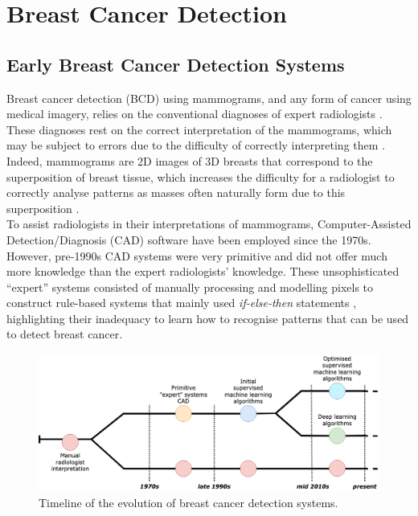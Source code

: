 
\section{Breast Cancer Detection}

\subsection{Early Breast Cancer Detection Systems}


Breast cancer detection (BCD) using mammograms, and any form of cancer using medical imagery, relies on the conventional diagnoses of expert radiologists \cite{Osareh2010}. These diagnoses rest on the correct interpretation of the mammograms, which may be subject to errors due to the difficulty of correctly interpreting them \cite{Elter2009}. Indeed, mammograms are 2D images of 3D breasts that correspond to the superposition of breast tissue, which increases the difficulty for a radiologist to correctly analyse patterns as masses often naturally form due to this superposition \cite{Elter2009}.\\

To assist radiologists in their interpretations of mammograms, Computer-Assisted Detection/Diagnosis (CAD) software have been employed since the 1970s. However, pre-1990s CAD systems were very primitive and did not offer much more knowledge than the expert radiologists' knowledge. These unsophisticated ``expert'' systems consisted of manually processing and modelling pixels to construct rule-based systems that mainly used \textit{if-else-then} statements \cite{Litjens2017}, highlighting their inadequacy to learn how to recognise patterns that can be used to detect breast cancer.

\begin{figure}[ht]
\centerline{\includegraphics[width=\textwidth]{Dissertation/figures/litsurvey/bcd_timeline.png}}
\caption{\label{fig:litsurvey-bcd-timeline}Timeline of the evolution of breast cancer detection systems.}
\end{figure}

